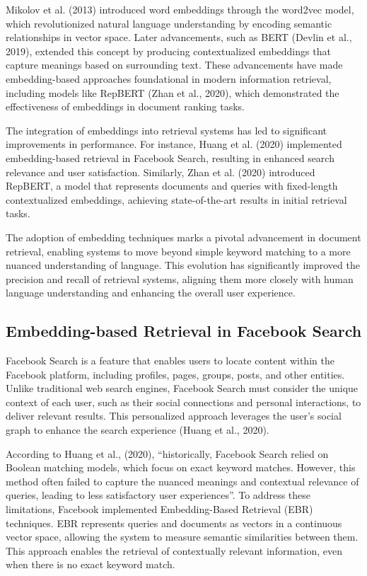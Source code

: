 Mikolov et al. (2013) introduced word embeddings through the word2vec model, which revolutionized natural language understanding by encoding semantic relationships in vector space. Later advancements, such as BERT (Devlin et al., 2019), extended this concept by producing contextualized embeddings that capture meanings based on surrounding text. These advancements have made embedding-based approaches foundational in modern information retrieval, including models like RepBERT (Zhan et al., 2020), which demonstrated the effectiveness of embeddings in document ranking tasks.

The integration of embeddings into retrieval systems has led to significant improvements in performance. For instance, Huang et al. (2020) implemented embedding-based retrieval in Facebook Search, resulting in enhanced search relevance and user satisfaction. Similarly, Zhan et al. (2020) introduced RepBERT, a model that represents documents and queries with fixed-length contextualized embeddings, achieving state-of-the-art results in initial retrieval tasks.

The adoption of embedding techniques marks a pivotal advancement in document retrieval, enabling systems to move beyond simple keyword matching to a more nuanced understanding of language. This evolution has significantly improved the precision and recall of retrieval systems, aligning them more closely with human language understanding and enhancing the overall user experience.

\subsection{Embedding-based Retrieval in Facebook Search}

\noindent Facebook Search is a feature that enables users to locate content within the Facebook platform, including profiles, pages, groups, posts, and other entities. Unlike traditional web search engines, Facebook Search must consider the unique context of each user, such as their social connections and personal interactions, to deliver relevant results. This personalized approach leverages the user's social graph to enhance the search experience (Huang et al., 2020).

According to Huang et al., (2020), “historically, Facebook Search relied on Boolean matching models, which focus on exact keyword matches. However, this method often failed to capture the nuanced meanings and contextual relevance of queries, leading to less satisfactory user experiences”. To address these limitations, Facebook implemented Embedding-Based Retrieval (EBR) techniques. EBR represents queries and documents as vectors in a continuous vector space, allowing the system to measure semantic similarities between them. This approach enables the retrieval of contextually relevant information, even when there is no exact keyword match.

